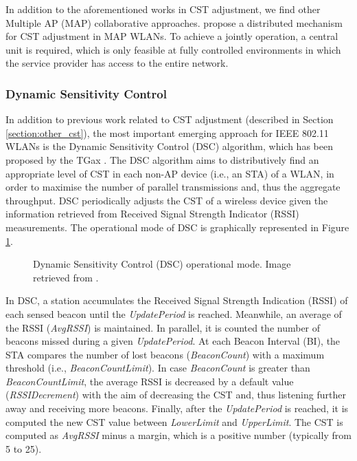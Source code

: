 \documentclass[12pt, a4paper,twoside]{tesi_upf}
\begin{document}
				In addition to the aforementioned works in CST adjustment, we find other Multiple AP (MAP) collaborative approaches. \cite{hua2009cooperative, hua2009distributed} propose a distributed mechanism for CST adjustment in MAP WLANs. To achieve a jointly operation, a central unit is required, which is only feasible at fully controlled environments in which the service provider has access to the entire network.	
			
			\subsubsection{Dynamic Sensitivity Control}
			\label{section:dsc}		
				In addition to previous work related to CST adjustment (described in Section \ref{section:other_cst}), the most important emerging approach for IEEE 802.11 WLANs is the Dynamic Sensitivity Control (DSC) algorithm, which has been proposed by the TGax \cite{smith2015dynamic}. The DSC algorithm aims to distributively find an appropriate level of CST in each non-AP device (i.e., an STA) of a WLAN, in order to maximise the number of parallel transmissions and, thus the aggregate throughput. DSC periodically adjusts the CST of a wireless device given the information retrieved from Received Signal Strength Indicator (RSSI) measurements. The operational mode of DSC is graphically represented in Figure \ref{fig:dsc_flowchart}.				
				\begin{figure}[t!]
					\centering
					\caption{Dynamic Sensitivity Control (DSC) operational mode. Image retrieved from \cite{afaqui2015evaluation}.}
					\label{fig:dsc_flowchart}
				\end{figure}
			
				In DSC, a station accumulates the Received Signal Strength Indication (RSSI) of  each  sensed  beacon until the \textit{UpdatePeriod} is reached. Meanwhile, an average of the RSSI (\textit{AvgRSSI}) is maintained. In parallel, it is counted the number of beacons missed during a given \textit{UpdatePeriod}. At each Beacon Interval (BI), the STA compares the number of lost beacons (\textit{BeaconCount}) with a maximum threshold (i.e., \textit{BeaconCountLimit}). In case \textit{BeaconCount} is greater than \textit{BeaconCountLimit}, the average RSSI is decreased by a default value (\textit{RSSIDecrement}) with the aim of decreasing the CST and, thus listening further away and receiving more beacons. Finally, after the \textit{UpdatePeriod} is reached, it is computed the new CST value between \textit{LowerLimit} and \textit{UpperLimit}. The CST is computed as \textit{AvgRSSI} minus a margin, which is a positive number (typically from 5 to 25). 
				
\end{document}
